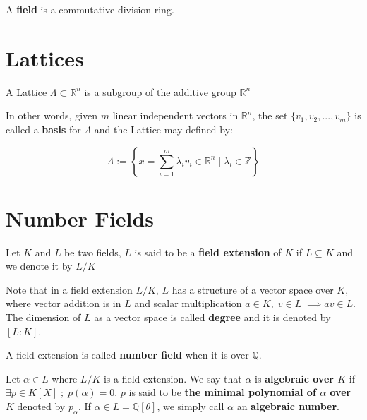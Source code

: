 \documentclass[Ingles]{ic-tese-v3}
\begin{document}
\begin{definition}
  A \textbf{field} is a commutative division ring.
\end{definition}

\section{Lattices}
\label{sec:orgd1564bb}

   \begin{definition}
  A Lattice $\Lambda \subset \mathbb{R}^n$ is a subgroup of the additive group $\mathbb{R}^n$
\end{definition}

In other words, given \(m\) linear independent vectors in \(\mathbb{R}^n\), the set
\(\{v_1, v_2, ..., v_m\}\) is called a \textbf{basis} for \(\Lambda\) and the Lattice may defined
by:

\begin{definition}
  \begin{equation}
    \Lambda := \left\{x = \sum_{i=1}^m{\lambda_iv_i} \in \mathbb{R}^n \; | \; \lambda_i \in \mathbb{Z}\right\}
  \end{equation}
\end{definition}

\section{Number Fields}
\label{sec:org4ba9301}

   \begin{definition}
  Let $K$ and $L$ be two fields, $L$ is said to be a \textbf{field extension} of
  $K$ if $L \subseteq K$ and we denote it by $L/K$
\end{definition}

Note that in a field extension \(L/K\), \(L\) has a structure of a vector space over
\(K\), where vector addition is in \(L\) and scalar multiplication \(a \in K, \; v \in L
\; \implies av \in L\). The dimension of \(L\) as a vector space is called
\textbf{degree} and it is denoted by \([L:K]\).

\begin{definition}
  A field extension is called \textbf{number field} when it is over $\mathbb{Q}$.
\end{definition}

\begin{definition}
  Let $\alpha \in L$ where $L/K$ is a field extension. We say that $\alpha$ is
  \textbf{algebraic over $K$} if $\exists p \in K[X] \;;\; p(\alpha) = 0$. $p$ is said to be
  \textbf{the minimal polynomial of $\alpha$ over $K$} denoted by $p_\alpha$. If $\alpha \in L =
  \mathbb{Q}[\theta]$, we simply call $\alpha$ an \textbf{algebraic number}.
\end{definition}
\end{document}
